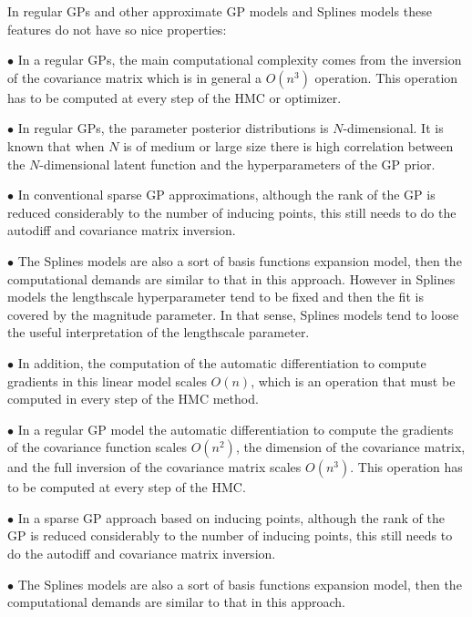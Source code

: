 \documentclass[]{interact}
\theoremstyle{plain}%
\theoremstyle{definition}
\theoremstyle{remark}
\begin{document}
In regular GPs and other approximate GP models and Splines models these features do not have so nice properties:

\vspace{2mm}
$\bullet$ In a regular GPs, the main computational complexity comes from the inversion of the covariance matrix which is in general a $O(n^3)$ operation. This operation has to be computed at every step of the HMC or optimizer.

\vspace{2mm}
$\bullet$ In regular GPs, the parameter posterior distributions is $N$-dimensional. It is known that when $N$ is of medium or large size there is high correlation between the $N$-dimensional latent function and the hyperparameters of the GP prior.

\vspace{2mm}
$\bullet$ In conventional sparse GP approximations, although the rank of the GP is reduced considerably to the number of inducing points, this still needs to do the autodiff and covariance matrix inversion.

\vspace{2mm}
$\bullet$ The Splines models are also a sort of basis functions expansion model, then the computational demands are similar to that in this approach. However in Splines models the lengthscale hyperparameter tend to be fixed and then the fit is covered by the magnitude parameter. In that sense, Splines models tend to loose the useful interpretation of the lengthscale parameter.

\vspace{2mm}
$\bullet$ In addition, the computation of the automatic differentiation to compute gradients in this linear model scales $O(n)$, which is an operation that must be computed in every step of the HMC method.

\vspace{2mm}
$\bullet$ In a regular GP model the automatic differentiation to compute the gradients of the covariance function scales $O(n^2)$, the dimension of the covariance matrix, and the full inversion of the covariance matrix scales $O(n^3)$. This operation has to be computed at every step of the HMC.

\vspace{2mm}
$\bullet$ In a sparse GP approach based on inducing points, although the rank of the GP is reduced considerably to the number of inducing points, this still needs to do the autodiff and covariance matrix inversion.

\vspace{2mm}
$\bullet$ The Splines models are also a sort of basis functions expansion model, then the computational demands are similar to that in this approach.
\end{document}

